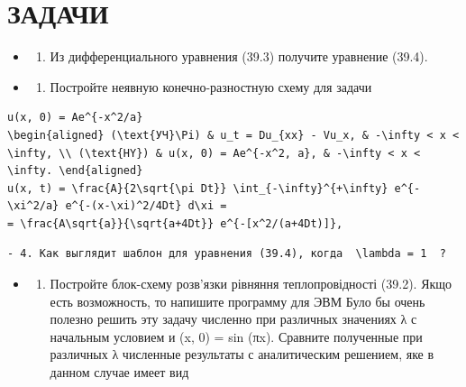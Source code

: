 \documentclass[
  ukrainian,
]{article}
\providecommand{\tightlist}{%
  \setlength{\itemsep}{0pt}\setlength{\parskip}{0pt}}
\begin{document}
\section{ЗАДАЧИ}\label{ux437ux430ux434ux430ux447ux438-8}

\begin{itemize}
\tightlist
\item
  \begin{enumerate}
  \def\labelenumi{\arabic{enumi}.}
  \tightlist
  \item
    Из дифференциального уравнения (39.3) получите уравнение (39.4).
  \end{enumerate}
\item
  \begin{enumerate}
  \def\labelenumi{\arabic{enumi}.}
  \setcounter{enumi}{1}
  \tightlist
  \item
    Постройте неявную конечно-разностную схему для задачи
  \end{enumerate}
\end{itemize}

\begin{verbatim}
u(x, 0) = Ae^{-x^2/a}
\begin{aligned} (\text{УЧ}\Pi) & u_t = Du_{xx} - Vu_x, & -\infty < x < \infty, \\ (\text{HY}) & u(x, 0) = Ae^{-x^2, a}, & -\infty < x < \infty. \end{aligned}
u(x, t) = \frac{A}{2\sqrt{\pi Dt}} \int_{-\infty}^{+\infty} e^{-\xi^2/a} e^{-(x-\xi)^2/4Dt} d\xi =
= \frac{A\sqrt{a}}{\sqrt{a+4Dt}} e^{-[x^2/(a+4Dt)]},
\end{verbatim}

\begin{verbatim}
- 4. Как выглядит шаблон для уравнения (39.4), когда  \lambda = 1  ?
\end{verbatim}

\begin{itemize}
\tightlist
\item
  \begin{enumerate}
  \def\labelenumi{\arabic{enumi}.}
  \setcounter{enumi}{4}
  \tightlist
  \item
    Постройте блок-схему розв'язки рівняння теплопровідності (39.2).
    Якщо есть возможность, то напишите программу для ЭВМ Було бы очень
    полезно решить эту задачу численно при различных значениях λ с
    начальным условием и (x, 0) = sin (πx). Сравните полученные при
    различных λ численные результаты с аналитическим решением, яке в
    данном случае имеет вид
  \end{enumerate}
\end{itemize}
\end{document}
